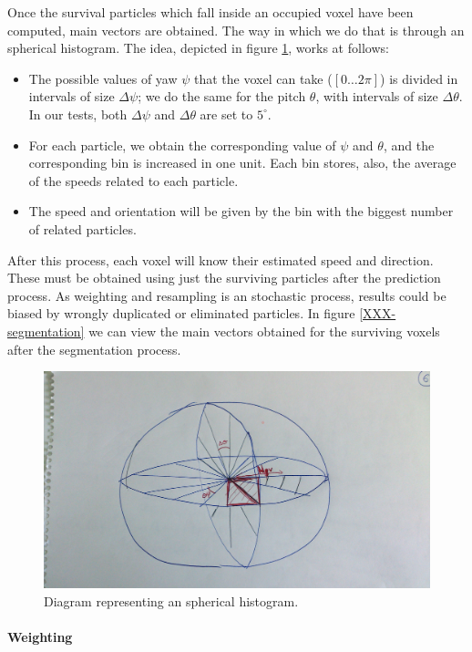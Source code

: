 Once the survival particles which fall inside an occupied voxel have been computed, main vectors are obtained. The way in which we do that is through an spherical histogram. The idea, depicted in figure \ref{fig:cp05_spherical_hist}, works at follows:
\begin{itemize}
 \item The possible values of yaw $\psi$ that the voxel can take ($[0\dots2\pi]$) is divided in intervals of size $\Delta\psi$; we do the same for the pitch $\theta$, with intervals of size $\Delta\theta$. In our tests, both $\Delta\psi$ and $\Delta\theta$ are set to $5^{\circ}$.
 \item For each particle, we obtain the corresponding value of $\psi$ and $\theta$, and the corresponding bin is increased in one unit. Each bin stores, also, the average of the speeds related to each particle.
 \item The speed and orientation will be given by the bin with the biggest number of related particles.
 \end{itemize}
 
 After this process, each voxel will know their estimated speed and direction. These must be obtained using just the surviving particles after the prediction process. As weighting and resampling is an stochastic process, results could be biased by wrongly duplicated or eliminated particles. In figure \ref{XXX-segmentation} we can view the main vectors obtained for the surviving voxels after the segmentation process.

\begin{figure}[th]
  \centering
  \includegraphics{sphericalHist}
  \caption{Diagram representing an spherical histogram.}\label{fig:cp05_spherical_hist}
\end{figure}

\paragraph{Weighting}\label{ch:chapter05_01_04_02_02}

